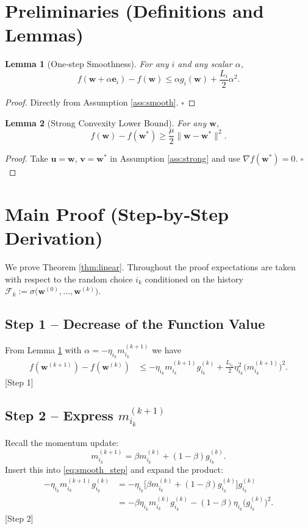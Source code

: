 \documentclass{article}
\newtheorem{lemma}{Lemma}
\begin{document}
\newpage
\section*{Preliminaries (Definitions and Lemmas)}
\begin{lemma}[One‑step Smoothness]\label{lem:smooth}
For any $i$ and any scalar $\alpha$,
\[
f(\mathbf w+\alpha\mathbf e_i)-f(\mathbf w)
\le \alpha g_i(\mathbf w)+\frac{L_i}{2}\alpha^{2}.
\]
\end{lemma}
\begin{proof}
Directly from Assumption \ref{ass:smooth}. \hfill $\square$
\end{proof}

\begin{lemma}[Strong Convexity Lower Bound]\label{lem:strong}
For any $\mathbf w$,
\[
f(\mathbf w)-f(\mathbf w^{*})\ge\frac{\mu}{2}\|\mathbf w-\mathbf w^{*}\|^{2}.
\]
\end{lemma}
\begin{proof}
Take $\mathbf u=\mathbf w$, $\mathbf v=\mathbf w^{*}$ in Assumption \ref{ass:strong}
and use $\nabla f(\mathbf w^{*})=0$. \hfill $\square$
\end{proof}

\section*{Main Proof (Step‑by‑Step Derivation)}
We prove Theorem \ref{thm:linear}. Throughout the proof expectations are taken
with respect to the random choice $i_k$ conditioned on the history
$\mathcal F_k:=\sigma\!\bigl(\mathbf w^{(0)},\dots ,\mathbf w^{(k)}\bigr)$.

\subsection*{Step 1 – Decrease of the Function Value}
From Lemma \ref{lem:smooth} with $\alpha=-\eta_{i_k} m_{i_k}^{(k+1)}$ we have
\begin{align}
f(\mathbf w^{(k+1)})-f(\mathbf w^{(k)})
&\le -\eta_{i_k} m_{i_k}^{(k+1)} g_{i_k}^{(k)}
      +\frac{L_{i_k}}{2}\eta_{i_k}^{2}\bigl(m_{i_k}^{(k+1)}\bigr)^{2}. \label{eq:smooth_step}
\end{align}
[Step 1]

\subsection*{Step 2 – Express $m_{i_k}^{(k+1)}$}
Recall the momentum update:
\[
m_{i_k}^{(k+1)}=\beta m_{i_k}^{(k)}+(1-\beta)g_{i_k}^{(k)}.
\]
Insert this into \eqref{eq:smooth_step} and expand the product:
\begin{align}
-\eta_{i_k} m_{i_k}^{(k+1)} g_{i_k}^{(k)}
&= -\eta_{i_k}\bigl[\beta m_{i_k}^{(k)}+(1-\beta)g_{i_k}^{(k)}\bigr]g_{i_k}^{(k)} \nonumber\\
&= -\beta\eta_{i_k} m_{i_k}^{(k)} g_{i_k}^{(k)}-(1-\beta)\eta_{i_k}\bigl(g_{i_k}^{(k)}\bigr)^{2}. \label{eq:expand1}
\end{align}
[Step 2]
\end{document}
